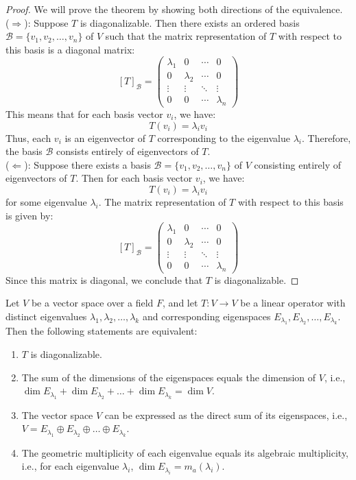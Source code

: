 \documentclass[openany]{book}
\begin{document}
\begin{proof}
    We will prove the theorem by showing both directions of the equivalence. \\
    ($\Rightarrow$): Suppose $T$ is diagonalizable. Then there exists an ordered basis $\mathcal{B} = \{v_1, v_2, \ldots, v_n\}$ of $V$ such that the matrix representation of $T$ with respect to this basis is a diagonal matrix:
    $$[T]_{\mathcal{B}} = \begin{pmatrix}
    \lambda_1 & 0 & \cdots & 0 \\
    0 & \lambda_2 & \cdots & 0 \\
    \vdots & \vdots & \ddots & \vdots \\
    0 & 0 & \cdots & \lambda_n
    \end{pmatrix}$$
    This means that for each basis vector $v_i$, we have:
    $$T(v_i) = \lambda_i v_i$$
    Thus, each $v_i$ is an eigenvector of $T$ corresponding to the eigenvalue $\lambda_i$. Therefore, the basis $\mathcal{B}$ consists entirely of eigenvectors of $T$. \\
    ($\Leftarrow$): Suppose there exists a basis $\mathcal{B} = \{v_1, v_2, \ldots, v_n\}$ of $V$ consisting entirely of eigenvectors of $T$. Then for each basis vector $v_i$, we have:
    $$T(v_i) = \lambda_i v_i$$
    for some eigenvalue $\lambda_i$. The matrix representation of $T$ with respect to this basis is given by:
    $$[T]_{\mathcal{B}} = \begin{pmatrix}
    \lambda_1 & 0 & \cdots & 0 \\
    0 & \lambda_2 & \cdots & 0 \\
    \vdots & \vdots & \ddots & \vdots \\
    0 & 0 & \cdots & \lambda_n
    \end{pmatrix}$$
    Since this matrix is diagonal, we conclude that $T$ is diagonalizable.
\end{proof}
\begin{mytheorem}
    Let $V$ be a vector space over a field $F$, and let $T: V \to V$ be a linear operator with distinct eigenvalues $\lambda_1, \lambda_2, \ldots, \lambda_k$ and corresponding eigenspaces $E_{\lambda_1}, E_{\lambda_2}, \ldots, E_{\lambda_k}$. Then the following statements are equivalent:
    \begin{enumerate}
        \item $T$ is diagonalizable. 
        \item The sum of the dimensions of the eigenspaces equals the dimension of $V$, i.e., $\dim E_{\lambda_1} + \dim E_{\lambda_2} + \ldots + \dim E_{\lambda_k} = \dim V$.
        \item The vector space $V$ can be expressed as the direct sum of its eigenspaces, i.e., $V = E_{\lambda_1} \oplus E_{\lambda_2} \oplus \ldots \oplus E_{\lambda_k}$.
        \item The geometric multiplicity of each eigenvalue equals its algebraic multiplicity, i.e., for each eigenvalue $\lambda_i$, $\dim E_{\lambda_i} = m_a(\lambda_i)$.
    \end{enumerate}
\end{mytheorem}
\end{document}
